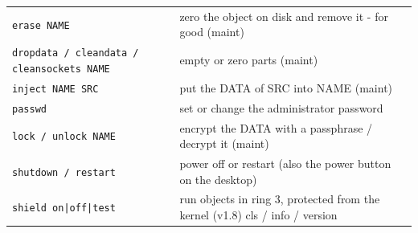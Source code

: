 \begin{longtable}{@{}p{5.2cm} p{9.8cm}@{}}
\texttt{erase NAME} & zero the object on disk and remove it - for good (maint) \\
\texttt{dropdata / cleandata / cleansockets NAME} & empty or zero parts (maint) \\
\texttt{inject NAME SRC} & put the DATA of SRC into NAME (maint) \\
\texttt{passwd} & set or change the administrator password \\
\texttt{lock / unlock NAME} & encrypt the DATA with a passphrase / decrypt it (maint) \\
\texttt{shutdown / restart} & power off or restart (also the power button on the desktop) \\
\texttt{shield on|off|test} & run objects in ring 3, protected from the kernel (v1.8) cls / info / version \\
\bottomrule
\end{longtable}
